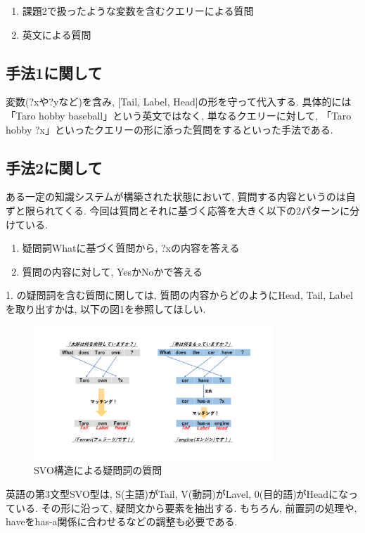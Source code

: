 ﻿\documentclass[uplatex,12pt]{jsarticle}
\begin{document}
\begin{enumerate}
\item 課題2で扱ったような変数を含むクエリーによる質問
\item 英文による質問
\end{enumerate}

\subsection{手法1に関して}
変数(?xや?yなど)を含み, [Tail, Label, Head]の形を守って代入する. 具体的には「Taro hobby baseball」という英文ではなく, 単なるクエリーに対して, 「Taro hobby ?x」といったクエリーの形に添った質問をするといった手法である.

\subsection{手法2に関して}
ある一定の知識システムが構築された状態において, 質問する内容というのは自ずと限られてくる. 今回は質問とそれに基づく応答を大きく以下の2パターンに分けている. 

\begin{enumerate}
\item 疑問詞Whatに基づく質問から,  ?xの内容を答える
\item 質問の内容に対して, YesかNoかで答える
\end{enumerate}

1. の疑問詞を含む質問に関しては, 質問の内容からどのようにHead, Tail, Labelを取り出すかは, 以下の図1を参照してほしい.
\begin{figure}[htbp]
 \begin{center}
  \includegraphics[width = 9cm, pagebox = cropbox, clip]{英文構造_疑問詞SVO.pdf}
 \end{center}
 \caption[]{SVO構造による疑問詞の質問}\label{fig:fig1.1}
\end{figure}

英語の第3文型SVO型は, S(主語)がTail, V(動詞)がLavel, 0(目的語)がHeadになっている. その形に沿って, 疑問文から要素を抽出する. もちろん, 前置詞の処理や, haveをhas-a関係に合わせるなどの調整も必要である.
\end{document}
